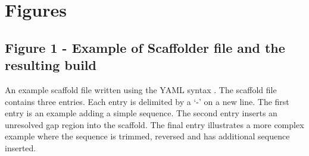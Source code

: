 \documentclass[10pt]{bmc_article}
\newenvironment{bmcformat}{\begin{raggedright}\baselineskip20pt\sloppy\setboolean{publ}{false}}{\end{raggedright}\baselineskip20pt\sloppy}
\begin{document}
\begin{bmcformat}
\clearpage

{
   }     %


\clearpage

\section*{Figures} %

\subsection*{Figure 1 - Example of Scaffolder file and the resulting build}

An example scaffold file written using the YAML syntax \cite{yaml}. The
scaffold file contains three entries. Each entry is delimited by a `-' on a new
line. The first entry is an example adding a simple sequence. The second entry
inserts an unresolved gap region into the scaffold. The final entry illustrates
a more complex example where the sequence is trimmed, reversed and has
additional sequence inserted. \pb

\end{bmcformat}
\end{document}
